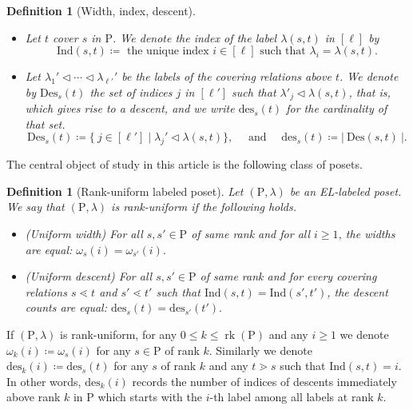 \documentclass[11pt,a4paper]{amsart}
\theoremstyle{results}
\theoremstyle{definitions}
\newtheorem{definition}[thm]{Definition}
\def\P{\mathbb{P}}
\newcommand{\abs}[1]{\left\lvert#1\right\rvert}
\newcommand{\rk}{\operatorname{rk}}
\newcommand{\des}{\mathrm{des}}
\newcommand{\Ind}{\mathrm{Ind}}
\newcommand{\Des}{\mathrm{Des}}
\renewcommand{\P}{\mathrm{P}}
\newcommand{\ind}{\mathrm{Ind}}
\begin{document}
\begin{definition}[Width, index, descent]
\begin{itemize}[leftmargin=23pt,itemsep=-1pt]
    \item Let $t$ cover $s$ in $\P$. We denote the \emph{index} of the label $\lambda(s, t)$ in $[\ell]$ by 
    \[
    \ind(s, t) \coloneqq \text{ the unique index $i \in [\ell]$ such that } \lambda_i =    \lambda(s, t). 
    \] 

    \item Let $\lambda_1' \vartriangleleft \cdots \vartriangleleft \lambda_{\ell'}'$ be the labels of the covering relations above $t$. We denote by $\Des_{s}(t)$ the set of indices $j$ in $[\ell']$ such that $\lambda'_j \vartriangleleft \lambda(s, t)$, that is, which gives rise to a descent, and we write $\des_{s}(t)$ for the cardinality of that set. 
    \begin{equation*}
        \Des_{s}(t) \coloneqq \{\: j \in [\ell']\mid \lambda_j' \vartriangleleft \lambda(s, t)\}, \quad \text{ and } \quad \des_{s}(t) \coloneqq \abs{\:\Des(s, t)\:}.  
    \end{equation*}
\end{itemize}
\end{definition}

The central object of study in this article is the following class of posets.

\begin{definition}[Rank-uniform labeled poset]
Let $(\P, \lambda)$ be an EL-labeled poset. We say that $(\P, \lambda)$ is \textit{rank-uniform} if the following holds.
\begin{itemize}
    \item (Uniform width) For all $s, s' \in \P$ of same rank and for all $i \geqslant 1$, the widths are equal: $\omega_s(i) = \omega_{s'}(i).$
    \item (Uniform descent) For all $s, s' \in \P$ of same rank and for every covering relations $s \lessdot t$ and $s' \lessdot t'$ such that $\ind(s,t) = \ind(s',t')$, the descent counts are equal: $\des_{s}(t) = \des_{s'}(t').$
\end{itemize}
\end{definition}
If $(\P, \lambda)$ is rank-uniform, for any $0 \leqslant k \leqslant \rk(\P)$ and any $i \geqslant 1$ we denote $\omega_k(i) \coloneqq \omega_s(i)$ for any $s \in \P$ of rank $k$. Similarly we denote $\des_k(i) \coloneqq \des_{s}(t)$ for any $s$ of rank $k$ and any $t \gtrdot s$ such that $\Ind(s, t) = i$. In other words, $\des_k(i)$ records the number of indices of descents immediately above rank $k$ in $\P$ which starts with the $i$-th label among all labels at rank $k$.
\end{document}
